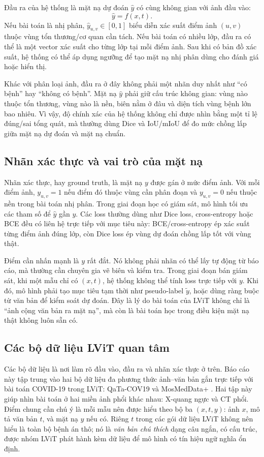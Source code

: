 Đầu ra của hệ thống là mặt nạ dự đoán \(\hat{y}\) có cùng không gian với ảnh đầu vào:
\[
\hat{y}=f(x,t).
\]
Nếu bài toán là nhị phân, \(\hat{y}_{u,v}\in[0,1]\) biểu diễn xác suất điểm ảnh \((u,v)\) thuộc vùng tổn thương/cơ quan cần tách. Nếu bài toán có nhiều lớp, đầu ra có thể là một vector xác suất cho từng lớp tại mỗi điểm ảnh. Sau khi có bản đồ xác suất, hệ thống có thể áp dụng ngưỡng để tạo mặt nạ nhị phân dùng cho đánh giá hoặc hiển thị.

Khác với phân loại ảnh, đầu ra ở đây không phải một nhãn duy nhất như ``có bệnh'' hay ``không có bệnh''. Mặt nạ \(\hat{y}\) phải giữ cấu trúc không gian: vùng nào thuộc tổn thương, vùng nào là nền, biên nằm ở đâu và diện tích vùng bệnh lớn bao nhiêu. Vì vậy, độ chính xác của hệ thống không chỉ được nhìn bằng một tỉ lệ đúng/sai tổng quát, mà thường dùng Dice và IoU/mIoU để đo mức chồng lấp giữa mặt nạ dự đoán và mặt nạ chuẩn.

\subsection{Nhãn xác thực và vai trò của mặt nạ}

Nhãn xác thực, hay ground truth, là mặt nạ \(y\) được gán ở mức điểm ảnh. Với mỗi điểm ảnh, \(y_{u,v}=1\) nếu điểm đó thuộc vùng cần phân đoạn và \(y_{u,v}=0\) nếu thuộc nền trong bài toán nhị phân. Trong giai đoạn học có giám sát, mô hình tối ưu các tham số để \(\hat{y}\) gần \(y\). Các loss thường dùng như Dice loss, cross-entropy hoặc BCE đều có liên hệ trực tiếp với mục tiêu này: BCE/cross-entropy ép xác suất từng điểm ảnh đúng lớp, còn Dice loss ép vùng dự đoán chồng lấp tốt với vùng thật.

Điểm cần nhấn mạnh là \(y\) rất đắt. Nó không phải nhãn có thể lấy tự động từ báo cáo, mà thường cần chuyên gia vẽ biên và kiểm tra. Trong giai đoạn bán giám sát, khi một mẫu chỉ có \((x,t)\), hệ thống không thể tính loss trực tiếp với \(y\). Khi đó, mô hình phải tạo mục tiêu tạm thời như pseudo-label \(\tilde{y}\), hoặc dùng ràng buộc từ văn bản để kiểm soát dự đoán. Đây là lý do bài toán của LViT không chỉ là ``ảnh cộng văn bản ra mặt nạ'', mà còn là bài toán học trong điều kiện mặt nạ thật không luôn sẵn có.

\subsection{Các bộ dữ liệu LViT quan tâm}

Các bộ dữ liệu là nơi làm rõ đầu vào, đầu ra và nhãn xác thực ở trên. Báo cáo này tập trung vào hai bộ dữ liệu đa phương thức ảnh--văn bản gắn trực tiếp với bài toán COVID-19 trong LViT: QaTa-COV19 và MosMedData+ \cite{li2023lvit,lvitOfficialRepo}. Hai tập này giúp nhìn bài toán ở hai miền ảnh phổi khác nhau: X-quang ngực và CT phổi. Điểm chung cần chú ý là mỗi mẫu nên được hiểu theo bộ ba \((x,t,y)\): ảnh \(x\), mô tả văn bản \(t\), và mặt nạ \(y\) nếu có. Riêng \(t\) trong các gói dữ liệu LViT không nên hiểu là toàn bộ bệnh án thô; nó là \textit{văn bản chú thích} dạng câu ngắn, có cấu trúc, được nhóm LViT phát hành kèm dữ liệu để mô hình có tín hiệu ngữ nghĩa ổn định.

